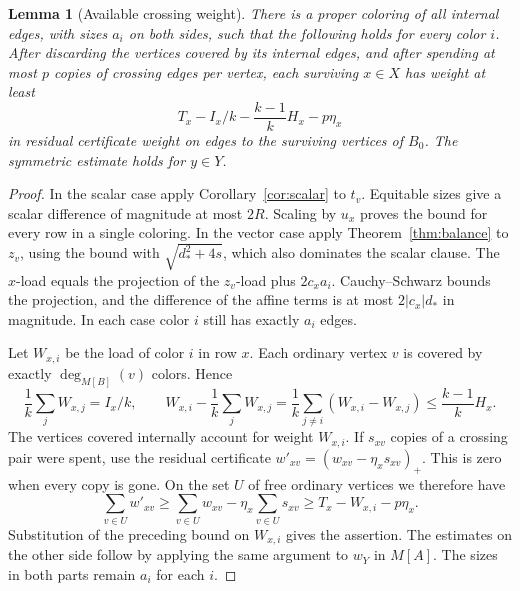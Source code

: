 \documentclass[11pt]{article}
\newtheorem{lemma}[theorem]{Lemma}
\begin{document}
\begin{lemma}[Available crossing weight]\label{lem:available}
There is a proper coloring of all internal edges, with sizes \(a_i\) on both sides, such that the following holds for every color \(i\). After discarding the vertices covered by its internal edges, and after spending at most \(p\) copies of crossing edges per vertex, each surviving \(x\in X\) has weight at least
\[
 T_x-I_x/k-\frac{k-1}{k}H_x-p\eta_x
\]
in residual certificate weight on edges to the surviving vertices of \(B_0\). The symmetric estimate holds for \(y\in Y\).
\end{lemma}

\begin{proof}
In the scalar case apply Corollary~\ref{cor:scalar} to \(t_v\). Equitable sizes give a scalar difference of magnitude at most \(2R\). Scaling by \(u_x\) proves the bound for every row in a single coloring. In the vector case apply Theorem~\ref{thm:balance} to \(z_v\), using the bound with \(\sqrt{d_*^2+4s}\), which also dominates the scalar clause. The \(x\)-load equals the projection of the \(z_v\)-load plus \(2c_x a_i\). Cauchy--Schwarz bounds the projection, and the difference of the affine terms is at most \(2|c_x|d_*\) in magnitude. In each case color \(i\) still has exactly \(a_i\) edges.

Let \(W_{x,i}\) be the load of color \(i\) in row \(x\). Each ordinary vertex \(v\) is covered by exactly \(\deg_{M[B]}(v)\) colors. Hence
\[
 \frac1k\sum_j W_{x,j}=I_x/k,\qquad
 W_{x,i}-\frac1k\sum_jW_{x,j}
       =\frac1k\sum_{j\ne i}(W_{x,i}-W_{x,j})
       \le\frac{k-1}{k}H_x.
\]
The vertices covered internally account for weight \(W_{x,i}\). If \(s_{xv}\) copies of a crossing pair were spent, use the residual certificate \(w'_{xv}=(w_{xv}-\eta_x s_{xv})_+\). This is zero when every copy is gone. On the set \(U\) of free ordinary vertices we therefore have
\[
 \sum_{v\in U} w'_{xv}
 \ge \sum_{v\in U} w_{xv}-\eta_x\sum_{v\in U}s_{xv}
 \ge T_x-W_{x,i}-p\eta_x.
\]
Substitution of the preceding bound on \(W_{x,i}\) gives the assertion. The estimates on the other side follow by applying the same argument to \(w_Y\) in \(M[A]\). The sizes in both parts remain \(a_i\) for each \(i\).
\end{proof}
\end{document}
